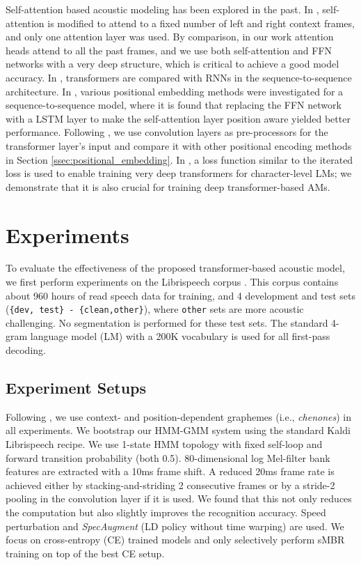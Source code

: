 \documentclass{article}
\begin{document}
Self-attention based acoustic modeling has been explored in the past. In \cite{povey2018time}, self-attention is modified to attend to a fixed number of left and right context frames, and only one attention layer was used. By comparison, in our work attention heads attend to all the past frames, and we use both self-attention and FFN networks with a very deep structure, which is critical to achieve a good model accuracy. In \cite{karita2019comparative}, transformers are compared with RNNs in the sequence-to-sequence architecture. In \cite{sperber2018self}, various positional embedding methods were investigated for a sequence-to-sequence model, where it is found that replacing the FFN network with a LSTM layer to make the self-attention layer position aware yielded better performance. Following \cite{mohamed2019transformers}, we use convolution layers as pre-processors for the transformer layer's input and compare it with other positional encoding methods in Section \ref{ssec:positional_embedding}. In \cite{al2019character}, a loss function similar to the iterated loss is used to enable training very deep transformers for character-level LMs; we demonstrate that it is also crucial for training deep transformer-based AMs.

\section{Experiments}
\label{sec:exp}
To evaluate the effectiveness of the proposed transformer-based acoustic model, we first perform experiments on the Librispeech corpus \cite{panayotov2015librispeech}. This corpus contains about 960 hours of read speech data for training, and 4 development and test sets (\texttt{\{dev, test\} - \{clean,other\}}), where \texttt{other} sets are more acoustic challenging. No segmentation is performed for these test sets. The standard 4-gram language model (LM) with a 200K vocabulary is used for all first-pass decoding. 




\subsection{Experiment Setups}

Following \cite{le2019senones}, we use context- and position-dependent graphemes (i.e., \textit{chenones}) in all experiments. We bootstrap our HMM-GMM system using the standard Kaldi \cite{Povey_ASRU2011} Librispeech recipe. We use 1-state HMM topology with fixed self-loop and forward transition probability (both 0.5). 80-dimensional log Mel-filter bank features are extracted with a 10ms frame shift. A reduced 20ms frame rate is achieved either by stacking-and-striding 2 consecutive frames or by a stride-2 pooling in the convolution layer if it is used. We found that this not only reduces the computation but also slightly improves the recognition accuracy. Speed perturbation \cite{ko2015audio} and \emph{SpecAugment} \cite{park2019specaugment} (LD policy without time warping) are used. We focus on cross-entropy (CE) trained models and only selectively perform sMBR \cite{vesely2013sequence} training on top of the best CE setup. 
\end{document}
